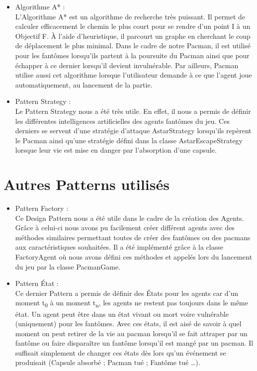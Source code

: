\documentclass[a4paper, 11pt]{article}
\begin{document}
\begin{itemize}
  \item Algorithme A* : \\
  
L'Algorithme A* est un algorithme de recherche très puissant. Il permet de calculer efficacement le chemin le plus court pour se rendre d'un point I à un Objectif F.
À l'aide d'heuristique, il parcourt un graphe en cherchant le coup de déplacement le plus minimal. Dans le cadre de notre Pacman, il est utilisé
pour les fantômes lorsqu'ils partent à la poursuite du Pacman ainsi que pour échapper à ce dernier lorsqu'il devient invulnérable. Par ailleurs,
Pacman utilise aussi cet algorithme lorsque l'utilisateur demande à ce que l'agent joue automatiquement, au lancement de la partie. \\

  \item Pattern Strategy : \\
  
Le Pattern Strategy nous a été très utile. En effet, il nous a permis de définir les différentes intelligences artificielles des agents fantômes 
du jeu. Ces derniers se servent d'une stratégie d'attaque AstarStrategy lorsqu'ils repèrent le Pacman ainsi qu'une stratégie défini dans la classe 
AstarEscapeStrategy lorsque leur vie est mise en danger par l'absorption d'une capsule.

\end{itemize}

\part{Autres Patterns utilisés}

\begin{itemize}
  \item Pattern Factory : \\
  
Ce Design Pattern nous a été utile dans le cadre de la création des Agents. Grâce à celui-ci nous avons pu facilement créer différent agents avec des
méthodes similaires permettant toutes de créer des fantômes ou des pacmans aux caractéristiques souhaitées. Il a été implémenté grâce à la classe 
FactoryAgent où nous avons défini ces méthodes et appelés lors du lancement du jeu par la classe PacmanGame. \\

  \item Pattern État : \\
  
Ce dernier Pattern a permis de définir des États pour les agents car d'un moment t\textsubscript{0} à un moment t\textsubscript{n}, les agents ne restent pas 
toujours dans le même état. Un agent peut être dans un état vivant ou mort voire vulnérable (uniquement) pour les fantômes. Avec ces états, 
il est aisé de savoir à quel moment on peut retirer de la vie au pacman lorsqu'il se fait attraper par un fantôme
ou faire disparaître un fantôme lorsqu'il est mangé par un pacman. Il suffisait simplement de changer ces états dès lors qu'un événement se 
produisait (Capsule absorbé ; Pacman tué ; Fantôme tué \ldots). 
\end{itemize}
\end{document}
